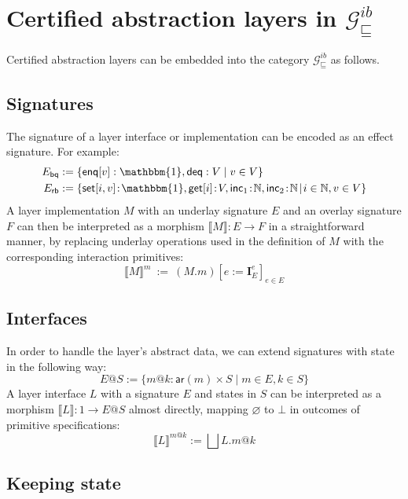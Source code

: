 \documentclass[draft,11pt]{report}
\newcommand{\gcat}{\mathcal{G}_{\sqsubseteq}}
\newcommand{\kw}[1]{\ensuremath{ \mathsf{#1} }}
\begin{document}

\section{Certified abstraction layers in $\gcat^{ib}$} \label{sec:intspec:cal} %

Certified abstraction layers can be embedded into
the category $\gcat^{ib}$ as follows.

\subsection{Signatures} %

The signature of a layer interface or implementation
can be encoded as an effect signature.
For example:
\begin{align*}
  E_\kw{bq} &:= \{
    \kw{enq}[v] : \mathbbm{1}, \kw{deq} : V \mid
    v \in V \} \\
  E_\kw{rb} &:= \{
    \kw{set}[i, v] \! : \! \mathbbm{1},
    \kw{get}[i] \! : \! V,
    \kw{inc}_1 \! : \! \mathbb{N},
    \kw{inc}_2 \! : \! \mathbb{N} \! \mid \!
    i \in \mathbb{N}, v \in V \}
\end{align*}
A layer implementation $M$ with
an underlay signature $E$ and
an overlay signature $F$
can then be interpreted as a morphism
$\llbracket M \rrbracket : E \rightarrow F$
in a straightforward manner,
by replacing underlay operations
used in the definition of $M$
with the corresponding interaction primitives:
\[
  \llbracket M \rrbracket^m \: := \: (M.m)[e := \mathbf{I}_E^e]_{e \in E}
\]


\subsection{Interfaces} %

In order to handle the layer's abstract data,
we can extend signatures with state in the following way:
\[
  E@S :=
    \{ m@k : \kw{ar}(m) \times S \mid
       m \in E, k \in S \}
\]
A layer interface $L$ with a signature $E$
and states in $S$
can be interpreted as
a morphism $\llbracket L \rrbracket : 1 \rightarrow E@S$
almost directly,
mapping $\varnothing$ to $\bot$
in outcomes of primitive specifications:
\[
  \llbracket L \rrbracket^{m@k} :=
    \bigsqcup L.m@k
\]


\subsection{Keeping state} %
\end{document}
